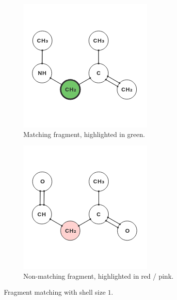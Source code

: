 \begin{figure}
\begin{subfigure}[t]{0.29\textwidth}
\includegraphics[width=\textwidth]{img/shell_2.png}
\caption{Matching fragment, highlighted in green.}
\end{subfigure}%
\qquad
\begin{subfigure}[t]{0.29\textwidth}
\centering
\includegraphics[width=\textwidth]{img/shell_3.png}
\caption{Non-matching fragment, highlighted in red / pink.}
\end{subfigure}
\caption{Fragment matching with shell size $1$.}
\end{figure}

